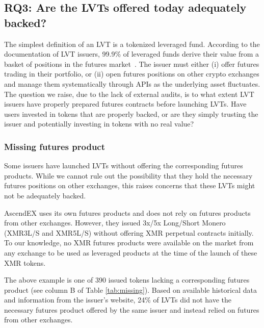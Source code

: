 \subsection{RQ3: Are the LVTs offered today adequately backed?}\label{subsec:backing}
The simplest definition of an LVT is a tokenized leveraged fund. According to the documentation of LVT issuers, 99.9\% of leveraged funds derive their value from a basket of positions in the futures market~\cite{AscendEX_Guide,MEXC_Guide,Binance_Guide,ByBit_Guide,ByDFi_Guide,FTX_Guide,GateIO_Guide,KuCoin_Guide,Pionex_Guide}. The issuer must either (i) offer futures trading in their portfolio, or (ii) open futures positions on other crypto exchanges and manage them systematically through APIs as the underlying asset fluctuates. The question we raise, due to the lack of external audits, is to what extent LVT issuers have properly prepared futures contracts before launching LVTs. Have users invested in tokens that are properly backed, or are they simply trusting the issuer and potentially investing in tokens with no real value?

\subsubsection{Missing futures product}
Some issuers have launched LVTs without offering the corresponding futures products. While we cannot rule out the possibility that they hold the necessary futures positions on other exchanges, this raises concerns that these LVTs might not be adequately backed.

\begin{example}
	AscendEX uses its own futures products and does not rely on futures products from other exchanges. However, they issued 3x/5x Long/Short Monero (XMR3L/S and XMR5L/S) without offering XMR perpetual contracts initially. To our knowledge, no XMR futures products were available on the market from any exchange to be used as leveraged products at the time of the launch of these XMR tokens.
\end{example}

The above example is one of 390 issued tokens lacking a corresponding futures product (see column B of Table \ref{tab:missing}). Based on available historical data and information from the issuer's website, 24\% of LVTs did not have the necessary futures product offered by the same issuer and instead relied on futures from other exchanges.


